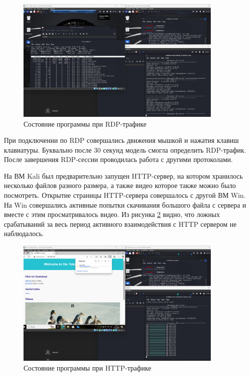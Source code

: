 \documentclass[bachelor, och, coursework]{SCWorks}
\begin{document}
\begin{figure}[H]
  \centering
  \includegraphics[width=0.9\textwidth]{pics/new1.png}
  \caption{Состояние программы при RDP-трафике}
  \label{rdp1}
\end{figure}

При подключении по RDP совершались движения мышкой и нажатия клавиш клавиатуры. Буквально после 30 секунд
модель смогла определить RDP-трафик. После завершения RDP-сессии проводилась работа с другими протоколами.

На ВМ Kali был предварительно запущен HTTP-сервер, на котором хранилось несколько файлов разного размера, а также 
видео которое также можно было посмотреть. Открытие страницы HTTP-сервера совершалось с другой ВМ Win. На Win 
совершались активные попытки скачивания большого файла с сервера и вместе с этим просматривалось видео. Из рисунка \ref{http1}
видно, что ложных срабатываний за весь период активного взаимодействия с HTTP сервером не наблюдалось.

\begin{figure}[H]
  \centering
  \includegraphics[width=0.9\textwidth]{pics/new2.png}
  \caption{Состояние программы при HTTP-трафике}
  \label{http1}
\end{figure}
\end{document}
